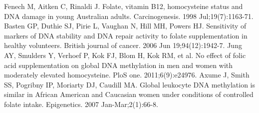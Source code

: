 \begin{thebibliography}{12}
		Fenech M, Aitken C, Rinaldi J. Folate, vitamin B12, homocysteine status and DNA damage in young Australian adults. Carcinogenesis. 1998 Jul;19(7):1163-71.
		Basten GP, Duthie SJ, Pirie L, Vaughan N, Hill MH, Powers HJ. Sensitivity of markers of DNA stability and DNA repair activity to folate supplementation in healthy volunteers. British journal of cancer. 2006 Jun 19;94(12):1942-7.
		Jung AY, Smulders Y, Verhoef P, Kok FJ, Blom H, Kok RM, et al. No effect of folic acid supplementation on global DNA methylation in men and women with moderately elevated homocysteine. PloS one. 2011;6(9):e24976.
		Axume J, Smith SS, Pogribny IP, Moriarty DJ, Caudill MA. Global leukocyte DNA methylation is similar in African American and Caucasian women under conditions of controlled folate intake. Epigenetics. 2007 Jan-Mar;2(1):66-8.
\end{thebibliography}